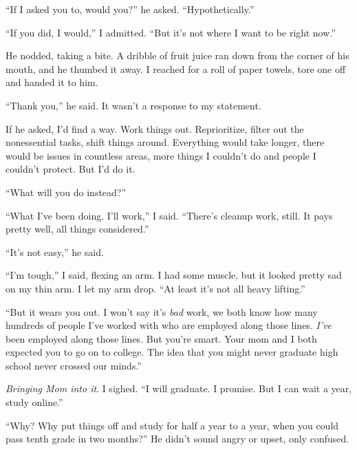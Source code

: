 ``If I asked you to, would you?'' he asked.  ``Hypothetically.''



``If you did, I would,'' I admitted.  ``But it's not where I want to be right now.''



He nodded, taking a bite.  A dribble of fruit juice ran down from the corner of his mouth, and he thumbed it away.  I reached for a roll of paper towels, tore one off and handed it to him.



``Thank you,'' he said.  It wasn't a response to my statement.



If he asked, I'd find a way.  Work things out.  Reprioritize, filter out the nonessential tasks, shift things around.  Everything would take longer, there would be issues in countless areas, more things I couldn't do and people I couldn't protect.  But I'd do it.



``What will you do instead?''



``What I've been doing.  I'll work,'' I said.  ``There's cleanup work, still.  It pays pretty well, all things considered.''



``It's not easy,'' he said.



``I'm tough,'' I said, flexing an arm.  I had some muscle, but it looked pretty sad on my thin arm.  I let my arm drop.  ``At least it's not all heavy lifting.''



``But it wears you out.  I won't say it's \emph{bad} work, we both know how many hundreds of people I've worked with who are employed along those lines.  \emph{I've} been employed along those lines.  But you're smart.  Your mom and I both expected you to go on to college.  The idea that you might never graduate high school never crossed our minds.''



\emph{Bringing Mom into it}.  I sighed.  ``I will graduate.  I promise.  But I can wait a year, study online.''



``Why?  Why put things off and study for half a year to a year, when you could pass tenth grade in two months?''  He didn't sound angry or upset, only confused.



